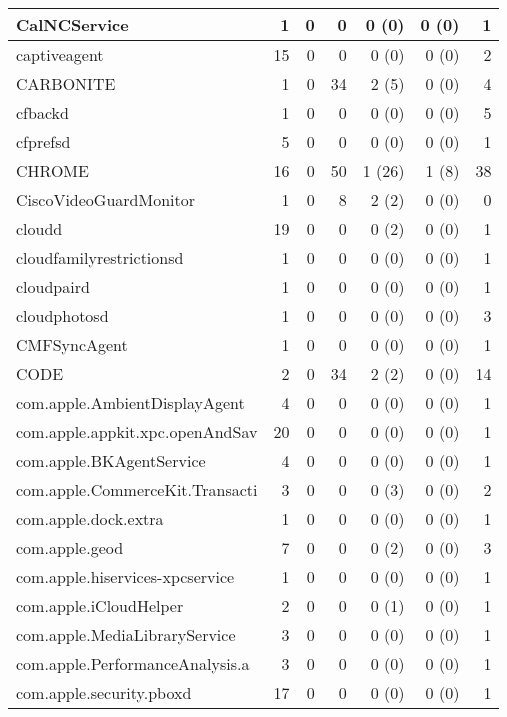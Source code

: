 \begin{adjustwidth}{-2in}{}
\begin{scriptsize}
\begin{longtable}[l]{ l | r | r | r | r | r | r }
    CalNCService & 1 &  0 &  0 &  0 (0) &  0 (0) &  1 \\ \hline
    captiveagent &  15 &  0 &  0 &  0 (0) &  0 (0) &  2 \\ \hline
    CARBONITE &  1 &  0 & 34 &  2 (5) &  0 (0) &  4 \\ \hline
    cfbackd &  1 &  0 &  0 &  0 (0) &  0 (0) &  5 \\ \hline
    cfprefsd & 5 &  0 &  0 &  0 (0) &  0 (0) &  1 \\ \hline
    CHROME &  16 &  0 & 50 & 1 (26) &  1 (8) & 38 \\ \hline
    CiscoVideoGuardMonitor & 1 &  0 &  8 &  2 (2) &  0 (0) &  0 \\ \hline
    cloudd &  19 &  0 &  0 &  0 (2) &  0 (0) &  1 \\ \hline
    cloudfamilyrestrictionsd & 1 &  0 &  0 &  0 (0) &  0 (0) &  1 \\ \hline
    cloudpaird & 1 &  0 &  0 &  0 (0) &  0 (0) &  1 \\ \hline
    cloudphotosd & 1 &  0 &  0 &  0 (0) &  0 (0) &  3 \\ \hline
    CMFSyncAgent & 1 &  0 &  0 &  0 (0) &  0 (0) &  1 \\ \hline
    CODE & 2 &  0 & 34 &  2 (2) &  0 (0) & 14 \\ \hline
    com.apple.AmbientDisplayAgent &  4 &  0 &  0 &  0 (0) &  0 (0) &  1 \\ \hline
    com.apple.appkit.xpc.openAndSav & 20 &  0 &  0 &  0 (0) &  0 (0) &  1 \\ \hline
    com.apple.BKAgentService & 4 &  0 &  0 &  0 (0) &  0 (0) &  1 \\ \hline
    com.apple.CommerceKit.Transacti &  3 &  0 &  0 &  0 (3) &  0 (0) &  2 \\ \hline
    com.apple.dock.extra & 1 &  0 &  0 &  0 (0) &  0 (0) &  1 \\ \hline
    com.apple.geod & 7 &  0 &  0 &  0 (2) &  0 (0) &  3 \\ \hline
    com.apple.hiservices-xpcservice &  1 &  0 &  0 &  0 (0) &  0 (0) &  1 \\ \hline
    com.apple.iCloudHelper & 2 &  0 &  0 &  0 (1) &  0 (0) &  1 \\ \hline
    com.apple.MediaLibraryService &  3 &  0 &  0 &  0 (0) &  0 (0) &  1 \\ \hline
    com.apple.PerformanceAnalysis.a &  3 &  0 &  0 &  0 (0) &  0 (0) &  1 \\ \hline
    com.apple.security.pboxd &  17 &  0 &  0 &  0 (0) &  0 (0) &  1 \\ \hline

\end{longtable}
\end{scriptsize}
\end{adjustwidth}
